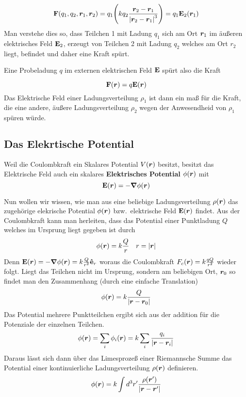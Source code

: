 \begin{equation*}
  \vb F(q_1, q_2, \vb*r_1, \vb*r_2) 
  = 
  q_1 
  \qty(k q_2 \frac{\vb*r_2 - \vb*r_1}{\abs{\vb*r_2 - \vb*r_1}^3})
  = q_1 \vb E_2(\vb*r_1)
\end{equation*}
Man verstehe dies so, dass Teilchen 1 mit Ladung $q_1$ 
sich am Ort $\vb*r_1$ im äußeren elektrisches Feld $\vb E_2$, 
erzeugt von Teilchen 2 mit Ladung $q_2$ welches am Ort $r_2$ liegt, befindet und daher eine Kraft spürt.

Eine Probeladung $q$ im externen elektrischen Feld $\vb E$ spürt also die Kraft

\begin{equation}
  \vb F(\vb*r) = q \vb E(\vb*r)
\end{equation}
Das Elektrische Feld einer Ladungsverteilung $\rho_1$ ist dann ein 
maß für die Kraft, die eine andere, äußere Ladungsverteilung $\rho_2$ 
wegen der Anwesendheid von $\rho_1$ spüren würde. 

\subsection{Das Elekrtische Potential}%
\label{ssub:E-pot}
Weil die Coulombkraft ein
Skalares Potential $V(\vb*r)$ besitzt, 
besitzt das Elektrische Feld auch ein skalares \textbf{Elektrisches Potential}
$\phi(\vb*r)$ mit
\begin{equation}
  \vb E(\vb*r)=-\grad \phi(\vb*r)
\end{equation}


Nun wollen wir wissen, wie man aus eine beliebige 
Ladungsverteilung $\rho(\vb*r)$ das zugehörige
elekrische Potential $\phi(\vb*r)$ bzw.\ elektrische Feld $\vb E(\vb*r)$ 
findet. Aus der Coulombkraft kann man herleiten, dass das Potential
einer Punktladung $Q$ welches im Ursprung liegt gegeben ist durch
\begin{equation*}
  \phi(\vb*r) = k  \frac{Q}{r} \quad r=\abs{\vb*r}
\end{equation*}
Denn $\vb E(\vb*r)=-\grad\phi(\vb*r)=k \frac{Q}{r^2}\vu e_r $ 
woraus die Coulombkraft $F_c(\vb*r)=k \frac{qQ}{r^2}$ wieder folgt.
Liegt das Teilchen nicht im Ursprung, sondern am beliebigen Ort, $\vb*r_0$
so findet man den Zusammenhang (durch eine einfache Translation)
\begin{equation*}
  \phi(\vb*r) = k \frac{Q}{\abs{\vb*r - \vb*r_0}}
\end{equation*}
Das Potential mehrere Punktteilchen ergibt sich aus der addition für die 
Potenziale der einzelnen Teilchen.
\begin{equation*}
  \phi(\vb*r) = \sum_i \phi_i(\vb*r) = k\sum_i \frac{q_i}{\abs{\vb*r-\vb*r_i}}
\end{equation*}
Daraus lässt sich dann über das Limesprozeß einer Riemannsche Summe das 
Potential einer kontinuierliche Ladungsverteilung $\rho(\vb*r)$ definieren.
\begin{equation}
  \label{eq:potential}
  \phi(\vb*r) = k \int d^3 r' \frac{\rho(\vb*r')}{\abs{\vb*r-\vb*r'}} 
\end{equation}

